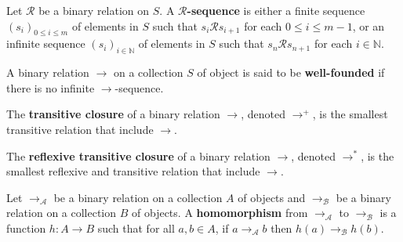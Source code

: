   \begin{definition}
    \label{def:binary_relation:sequence}
    Let \(\mathcal{R}\) be a binary relation on $S$.
    A \textbf{\( \mathcal{R} \)-sequence} is either a finite sequence \( \left( s_i \right)_{0 \leq i \leq m} \) of elements in $S$ such that \(s_i \mathcal{R} s_{i+1}\) for each \( 0 \leq i \leq m-1\), or an infinite sequence \((s_i)_{i \mathop{\in} \mathbb{N}}\) of elements in $S$ such that \(s_n \mathcal{R} s_{n+1}\) for each \(i \mathop{\in} \mathbb{N}\).
\end{definition}

\begin{definition}
    \label{def:binary_relation:well_founded}
    A binary relation $\to$ on a collection $S$ of object is said to be \textbf{well-founded} if there is no infinite $\to$-sequence. 
\end{definition}

\begin{definition}
    \label{def:binary_relation:transitive_closure}
    The \textbf{transitive closure} of a binary relation $\to$, denoted $\to^+$, is the smallest transitive relation that include \( \mathop{\to} \).
  \end{definition}
  
  \begin{definition}
    \label{def:binary_relation:reflexive_transitive_closure}
    The \textbf{reflexive transitive closure} of a binary relation $\to$, denoted $\to^*$, is the smallest reflexive and transitive relation that include \( \mathop{\to} \).
  \end{definition}

  \begin{definition}
    \label{def:binary_relation:homomorphism}
    Let $\to_\mathcal{A}$ be a binary relation on a collection $A$ of objects and $\to_\mathcal{B}$ be a binary relation on a collection $B$ of objects. A \textbf{homomorphism} from $\to_\mathcal{A}$ to $\to_\mathcal{B}$ is a function \( h: A \mathop{\to} B \) such that for all \( a, b \mathop{\in} A \), if \( a \mathop{\to} _\mathcal{A} b \) then \( h(a) \mathop{\to} _\mathcal{B} h(b) \).
  \end{definition}
  
